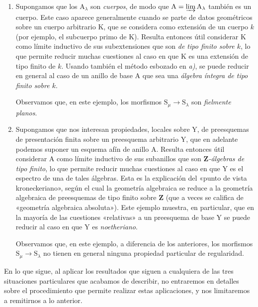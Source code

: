 \begin{env}[8.1.2]
\begin{enumerate}[label=\emph{\alph*)}]
Observamos que, en el ejemplo considerado aquí, los morfismos $\mathrm{S}_\mu\to\mathrm{S}_\lambda$ (para $\lambda\leqslant\mu$) son las \emph{inmersiones abiertas} canónicas $\mathrm{U}_\mu\hookrightarrow\mathrm{U}_\lambda$ y, \emph{a fortiori}, son morfismos \emph{planos} (aunque en general no fielmente planos), lo que explica el interés de los enunciados que recurren a tal restricción.

  \item
  Supongamos que los $\mathrm{A}_\lambda$ son \emph{cuerpos}, de modo que $\mathrm{A}=\varinjlim\mathrm{A}_\lambda$ también es un cuerpo.
Este caso aparece generalmente cuando se parte de datos geométricos sobre un cuerpo arbitrario $\mathrm{K}$, que se considera como extensión de un cuerpo $k$ (por ejemplo, el subcuerpo primo de $\mathrm{K}$).
Resulta entonces útil considerar $\mathrm{K}$ como límite inductivo de sus subextensiones que son \emph{de tipo finito sobre $k$}, lo que permite reducir muchas cuestiones al caso en que $\mathrm{K}$ es una extensión de tipo finito de $k$.
Usando también el método esbozado en \emph{a)}, se puede reducir en general al caso de un anillo de base $\mathrm{A}$ que sea una \emph{álgebra íntegra de tipo finito sobre $k$}.

Observamos que, en este ejemplo, los morfismos $\mathrm{S}_\mu\to\mathrm{S}_\lambda$ son \emph{fielmente planos}.

  \item
  Supongamos que nos interesan propiedades, locales sobre $\mathrm{Y}$, de preesquemas de presentación finita sobre un preesquema arbitrario $\mathrm{Y}$, que en adelante podemos suponer un esquema afín de anillo $\mathrm{A}$.
Resulta entonces útil considerar $\mathrm{A}$ como límite inductivo de sus subanillos que son \emph{$\mathbf{Z}$-álgebras de tipo finito}, lo que permite reducir muchas cuestiones al caso en que $\mathrm{Y}$ es el espectro de una de tales álgebras.
Esta es la explicación del «punto de vista kroneckeriano», según el cual la geometría algebraica se reduce a la
geometría algebraica de preesquemas de tipo finito sobre $\mathbf{Z}$ (que a veces se califica de «geometría algebraica absoluta»).
Este ejemplo muestra, en particular, que en la mayoría de las cuestiones «relativas» a un preesquema de base $\mathrm{Y}$ se puede reducir al caso en que $\mathrm{Y}$ es \emph{noetheriano}.

Observamos que, en este ejemplo, a diferencia de los anteriores, los morfismos $\mathrm{S}_\mu\to\mathrm{S}_\lambda$ no tienen en general ninguna propiedad particular de regularidad.
\end{enumerate}

En lo que sigue, al aplicar los resultados que siguen a cualquiera de las tres situaciones particulares que acabamos de describir, no entraremos en detalles sobre el procedimiento que permite realizar estas aplicaciones, y nos limitaremos a remitirnos a lo anterior.
\end{env}

